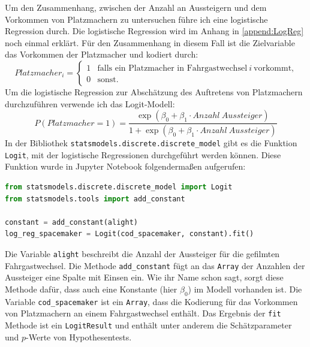 Um den Zusammenhang, zwischen der Anzahl an Aussteigern und dem Vorkommen von Platzmachern zu untersuchen führe ich eine logistische Regression durch. Die logistische Regression wird im Anhang in \ref{append:LogReg} noch einmal erklärt. Für den Zusammenhang in diesem Fall ist die Zielvariable das Vorkommen der Platzmacher und kodiert durch:
$$Platzmacher_i = 
	\begin{cases}
		1 & \text{falls ein Platzmacher in Fahrgastwechsel} \ i \ \text{vorkommt,} \\
		0 & \text{sonst.}
	\end{cases}$$
Um die logistische Regression zur Abschätzung des Auftretens von Platzmachern durchzuführen verwende ich das Logit-Modell:
\begin{equation}
P(Platzmacher=1) = \frac{\exp(\beta_0 + \beta_1 \cdot Anzahl \ Aussteiger)}{1+\exp(\beta_0 + \beta_1 \cdot Anzahl \ Aussteiger)}
\end{equation}
In der Bibliothek \texttt{statsmodels.discrete.discrete\_model} gibt es die Funktion \texttt{Logit}, mit der logistische Regressionen durchgeführt werden können. Diese Funktion wurde in \textsf{Jupyter Notebook} folgendermaßen aufgerufen:
\begin{lstlisting}[language=Python]
from statsmodels.discrete.discrete_model import Logit
from statsmodels.tools import add_constant

constant = add_constant(alight)
log_reg_spacemaker = Logit(cod_spacemaker, constant).fit()
\end{lstlisting}
Die Variable \texttt{alight} beschreibt die Anzahl der Aussteiger für die gefilmten Fahrgastwechsel. Die Methode \texttt{add\_constant} fügt an das \texttt{Array} der Anzahlen der Aussteiger eine Spalte mit Einsen ein. Wie ihr Name schon sagt, sorgt diese Methode dafür, dass auch eine Konstante (hier $\beta_0$) im Modell vorhanden ist. Die Variable \texttt{cod\_spacemaker} ist ein \texttt{Array}, dass die Kodierung für das Vorkommen von Platzmachern an einem Fahrgastwechsel enthält. Das Ergebnis der \texttt{fit} Methode ist ein \texttt{LogitResult} und enthält unter anderem die Schätzparameter und $p$-Werte von Hypothesentests.

